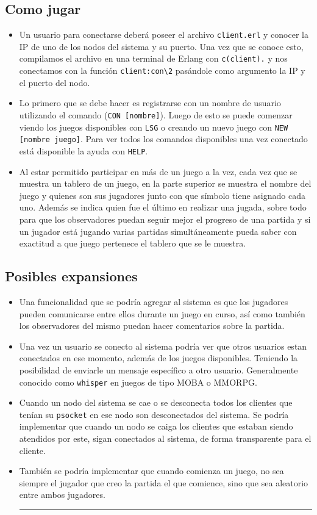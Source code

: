 \documentclass[a4paper]{article}
\newcommand{\blacktr}[0]{\item[$\blacktriangleright$]}
\begin{document}
\subsection*{Como jugar}
\begin{itemize}
   \blacktr Un usuario para conectarse deberá poseer el archivo \texttt{client.erl} y conocer la IP de uno de los nodos del sistema y su puerto. Una vez que se conoce esto, compilamos el archivo en una terminal de Erlang con \texttt{c(client).} y nos conectamos con la función \texttt{client:con\textbackslash2} pasándole como argumento la IP y el puerto del nodo. 
  
  \blacktr Lo primero que se debe hacer es registrarse con un nombre de usuario utilizando el comando (\texttt{CON [nombre]}). Luego de esto se puede comenzar viendo los juegos disponibles con \texttt{LSG} o creando un nuevo juego con \texttt{NEW [nombre juego]}. Para ver todos los comandos disponibles una vez conectado está disponible la ayuda con \texttt{HELP}.

  \blacktr Al estar permitido participar en más de un juego a la vez, cada vez que se muestra un tablero de un juego, en la parte superior se muestra el nombre del juego y quienes son sus jugadores junto con que símbolo tiene asignado cada uno. Además se indica quien fue el último en realizar una jugada, sobre todo para que los observadores puedan seguir mejor el progreso de una partida y si un jugador está jugando varias partidas simultáneamente pueda saber con exactitud a que juego pertenece el tablero que se le muestra.
\end{itemize}

\subsection*{Posibles expansiones}
\begin{itemize}
  \blacktr Una funcionalidad que se podría agregar al sistema es que los jugadores pueden comunicarse entre ellos durante un juego en curso, así como también los observadores del mismo puedan hacer comentarios sobre la partida.

  \blacktr Una vez un usuario se conecto al sistema podría ver que otros usuarios estan conectados en ese momento, además de los juegos disponibles. Teniendo la posibilidad de enviarle un mensaje específico a otro usuario. Generalmente conocido como \texttt{whisper} en juegos de tipo MOBA o MMORPG.

  \blacktr Cuando un nodo del sistema se cae o se desconecta todos los clientes que tenían su \texttt{psocket} en ese nodo son desconectados del sistema. Se podría implementar que cuando un nodo se caiga los clientes que estaban siendo atendidos por este, sigan conectados al sistema, de forma transparente para el cliente.

  \blacktr También se podría implementar que cuando comienza un juego, no sea siempre el jugador que creo la partida el que comience, sino que sea aleatorio entre ambos jugadores.

\rule{18cm}{0.4pt}
\end{itemize}
\end{document}
